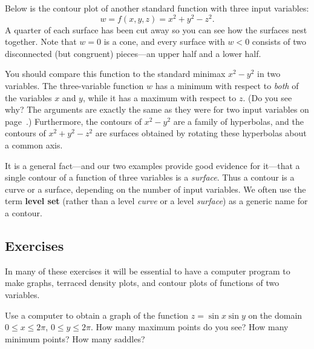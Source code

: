 {{{{

\newpage

	Below is the contour plot of another standard function 
with three input variables:
	\[
w = f(x, y, z) = x^2 + y^2 - z^2.
\]
A quarter of each surface has been cut away so you can see how the surfaces nest together.  Note that $w = 0$ is a cone, and every surface with $w < 0$ consists of two disconnected (but congruent) pieces---an upper half and a lower half.

	You should compare this function to the standard minimax $x^2 - y^2$ in two variables.  The three-variable function $w$ has a minimum with respect to {\em both\/} of the variables $x$ and $y$, while it has a maximum with respect to $z$.  (Do you see why?  The arguments are exactly the same as they were for two input variables on page~\pageref{saddle}.)  
Furthermore, the contours of $x^2 - y^2$ are a family of hyperbolas, and the contours of $x^2 + y^2 - z^2$ are surfaces obtained by rotating these hyperbolas about a common axis.


\newpage

	It is a general fact---and our two examples 
provide good evidence for it---that a single contour of a function of three variables is a {\em surface}.  Thus a contour is a curve or a surface, depending on the number of input variables.  We often use the term {\bf level set} (rather than a level {\em curve\/} or a level {\em surface\/}) as a generic name for a contour.  

\subsection{Exercises}

	In many of these exercises it will be essential to have a computer program to make graphs, terraced density plots, and contour plots of functions of two variables.
	
\numa  Use a computer to obtain a graph of the function $z = \sin{x} \sin{y}$ on the domain $0 \leq x \leq 2 \pi$, $0 \leq y \leq 2 \pi$.  How many maximum points do you see?  How many minimum points?  How many saddles?

}}}}
